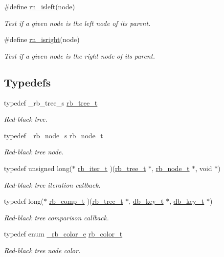 \begin{CompactItemize}
\#define \hyperlink{group__dbprim__rbtree_a36}{rn\_\-isleft}(node)
\begin{CompactList}\small\item\em Test if a given node is the left node of its parent.\item\end{CompactList}\item 
\#define \hyperlink{group__dbprim__rbtree_a37}{rn\_\-isright}(node)
\begin{CompactList}\small\item\em Test if a given node is the right node of its parent.\item\end{CompactList}\end{CompactItemize}
\subsection*{Typedefs}
\begin{CompactItemize}
\item 
typedef \_\-rb\_\-tree\_\-s \hyperlink{group__dbprim__rbtree_a0}{rb\_\-tree\_\-t}
\begin{CompactList}\small\item\em Red-black tree.\item\end{CompactList}\item 
typedef \_\-rb\_\-node\_\-s \hyperlink{group__dbprim__rbtree_a1}{rb\_\-node\_\-t}
\begin{CompactList}\small\item\em Red-black tree node.\item\end{CompactList}\item 
typedef unsigned long($\ast$ \hyperlink{group__dbprim__rbtree_a2}{rb\_\-iter\_\-t} )(\hyperlink{group__dbprim__rbtree_a0}{rb\_\-tree\_\-t} $\ast$, \hyperlink{group__dbprim__rbtree_a1}{rb\_\-node\_\-t} $\ast$, void $\ast$)
\begin{CompactList}\small\item\em Red-black tree iteration callback.\item\end{CompactList}\item 
typedef long($\ast$ \hyperlink{group__dbprim__rbtree_a3}{rb\_\-comp\_\-t} )(\hyperlink{group__dbprim__rbtree_a0}{rb\_\-tree\_\-t} $\ast$, \hyperlink{group__dbprim_a0}{db\_\-key\_\-t} $\ast$, \hyperlink{group__dbprim_a0}{db\_\-key\_\-t} $\ast$)
\begin{CompactList}\small\item\em Red-black tree comparison callback.\item\end{CompactList}\item 
typedef enum \hyperlink{group__dbprim__rbtree_a38}{\_\-rb\_\-color\_\-e} \hyperlink{group__dbprim__rbtree_a4}{rb\_\-color\_\-t}
\begin{CompactList}\small\item\em Red-black tree node color.\item\end{CompactList}\end{CompactItemize}
